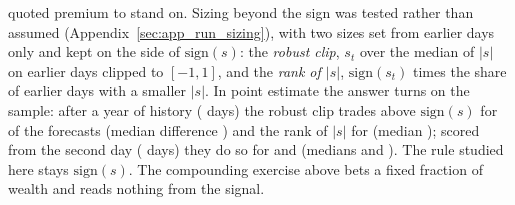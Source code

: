 quoted premium to stand on.
Sizing beyond the sign was tested rather than assumed
(Appendix~\ref{sec:app_run_sizing}), with two sizes set from earlier days only
and kept on the side of $\mathrm{sign}(s)$: the \emph{robust clip}, $s_t$ over
the median of $|s|$ on earlier days clipped to $[-1,1]$, and the \emph{rank of
$|s|$}, $\mathrm{sign}(s_t)$ times the share of earlier days with a smaller
$|s|$. In point estimate the answer turns on the sample: after a year of %
history (\runappSzDays{} days) the robust clip trades above $\mathrm{sign}(s)$ for
\runappSzClipAbove{} of the \runappSzForecasts{} forecasts (median difference
\runappSzClipMed) and the rank of $|s|$ for \runappSzRankAbove{} (median
\runappSzRankMed); scored from the second day (\runappSzDaysTwo{} days) they do so for
\runappSzClipAboveTwo{} and \runappSzRankAboveTwo{} (medians \runappSzClipMedTwo{} and
\runappSzRankMedTwo). The rule studied here stays $\mathrm{sign}(s)$. The
compounding exercise above bets a fixed fraction of wealth and reads nothing
from the signal.

